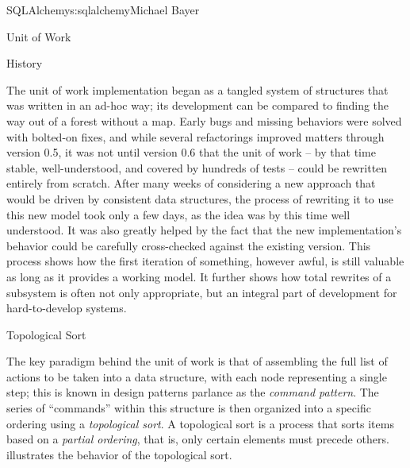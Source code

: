 \begin{aosachapter}{SQLAlchemy}{s:sqlalchemy}{Michael Bayer}
\begin{aosasect1}{Unit of Work}
\begin{aosasect2}{History}

The unit of work implementation began as a tangled system of structures that
was written in an ad-hoc way; its development can be compared to finding
the way out of a forest without a map. Early bugs and missing behaviors were
solved with bolted-on fixes, and while several refactorings improved matters
through version 0.5, it was not until version 0.6 that the unit of work – by
that time stable, well-understood, and covered by hundreds of tests – could be
rewritten entirely from scratch.  After many weeks of considering a new
approach that would be driven by consistent data structures, the process of
rewriting it to use this new model took only a few days, as the idea was
by this time well understood.  It was also
greatly helped by the fact that the new implementation's behavior could be
carefully cross-checked against the existing version. This process shows how
the first iteration of something, however awful, is still valuable as long as
it provides a working model.  It further shows how total rewrites of a subsystem
is often not only appropriate, but an integral part of development for
hard-to-develop systems.

\end{aosasect2}

\begin{aosasect2}{Topological Sort}

The key paradigm behind the unit of work is that of assembling the full list of
actions to be taken into a data structure, with each node representing a single step;
this is known in design patterns parlance as the \emph{command pattern}.   The series of
``commands'' within this structure is then organized into a specific ordering
using a \emph{topological sort}.   A topological sort is a process that sorts items based on a \emph{partial ordering},
that is, only certain elements must precede others.   illustrates the
behavior of the topological sort.



\end{aosasect2}
\end{aosasect1}
\end{aosachapter}
